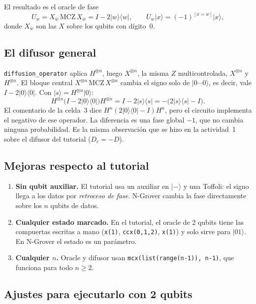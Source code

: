 \documentclass[11pt,a4paper]{article}
\providecommand{\ket}{}\renewcommand{\ket}[1]{\lvert #1\rangle}
\newcommand{\ketbra}[2]{\lvert #1\rangle\!\langle #2\rvert}
\begin{document}
El resultado es el oracle de fase
\begin{equation}
U_w = X_{\bar w}\,\mathrm{MCZ}\,X_{\bar w} = I-2\ketbra{w}{w},
\qquad U_w\ket{x} = (-1)^{[x=w]}\ket{x},
\label{eq:oracle}
\end{equation}
donde $X_{\bar w}$ son las $X$ sobre los qubits con dígito~0.

\subsection{El difusor general}

\texttt{diffusion\_operator} aplica $H^{\otimes n}$, luego $X^{\otimes n}$, la misma $Z$ multicontrolada,
$X^{\otimes n}$ y $H^{\otimes n}$. El bloque central $X^{\otimes n}\,\mathrm{MCZ}\,X^{\otimes n}$ cambia el
signo solo de $\ket{0\cdots0}$, es decir, vale $I-2\ketbra{0}{0}$. Con $\ket{s}=H^{\otimes n}\ket{0}$:
\begin{equation}
H^{\otimes n}\big(I-2\ketbra00\big)H^{\otimes n} = I-2\ketbra ss = -\big(2\ketbra ss-I\big).
\label{eq:difusor}
\end{equation}
El comentario de la celda~3 dice $H^n(2\ketbra00-I)H^n$, pero el circuito implementa el negativo de ese
operador. La diferencia es una fase global $-1$, que no cambia ninguna probabilidad. Es la misma
observación que se hizo en la actividad~1 sobre el difusor del tutorial ($D_c=-D$).

\subsection{Mejoras respecto al tutorial}

\begin{enumerate}
\item \textbf{Sin qubit auxiliar.} El tutorial usa un auxiliar en $\ket-$ y una Toffoli: el signo llega
a los datos por \emph{retroceso de fase}. N-Grover cambia la fase directamente sobre los $n$ qubits de datos.
\item \textbf{Cualquier estado marcado.} En el tutorial, el oracle de 2 qubits tiene las compuertas escritas
a mano (\texttt{x(1)}, \texttt{ccx(0,1,2)}, \texttt{x(1)}) y solo sirve para $\ket{01}$. En N-Grover el estado
es un parámetro.
\item \textbf{Cualquier $n$.} Oracle y difusor usan \texttt{mcx(list(range(n-1)), n-1)}, que funciona para todo $n\ge2$.
\end{enumerate}

\subsection{Ajustes para ejecutarlo con 2 qubits}
\end{document}
